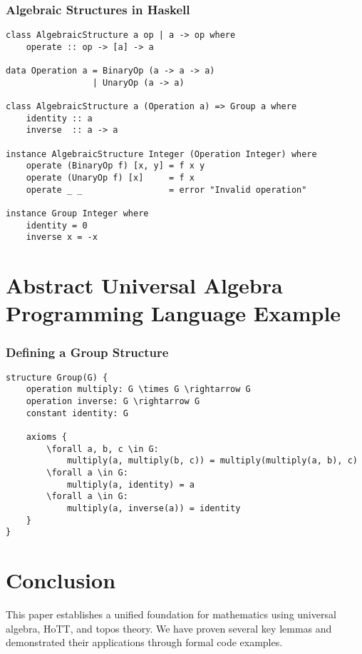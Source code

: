 \documentclass{article}
\begin{document}

\subsubsection{Algebraic Structures in Haskell}

\begin{lstlisting}
class AlgebraicStructure a op | a -> op where
    operate :: op -> [a] -> a

data Operation a = BinaryOp (a -> a -> a)
                 | UnaryOp (a -> a)

class AlgebraicStructure a (Operation a) => Group a where
    identity :: a
    inverse  :: a -> a

instance AlgebraicStructure Integer (Operation Integer) where
    operate (BinaryOp f) [x, y] = f x y
    operate (UnaryOp f) [x]     = f x
    operate _ _                 = error "Invalid operation"

instance Group Integer where
    identity = 0
    inverse x = -x
\end{lstlisting}

\section{Abstract Universal Algebra Programming Language Example}


\subsubsection{Defining a Group Structure}

\begin{lstlisting}
structure Group(G) {
    operation multiply: G \times G \rightarrow G
    operation inverse: G \rightarrow G
    constant identity: G

    axioms {
        \forall a, b, c \in G:
            multiply(a, multiply(b, c)) = multiply(multiply(a, b), c)
        \forall a \in G:
            multiply(a, identity) = a
        \forall a \in G:
            multiply(a, inverse(a)) = identity
    }
}
\end{lstlisting}


\section{Conclusion}

This paper establishes a unified foundation for mathematics using universal algebra, HoTT, and topos theory. We have proven several key lemmas and demonstrated their applications through formal code examples.
\end{document}
